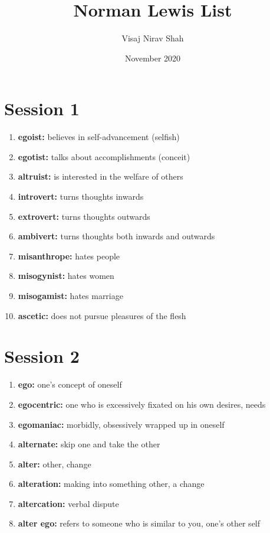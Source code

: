 \documentclass{article}
\title{\textbf{Norman Lewis List}}
\author{Visaj Nirav Shah}
\date{November 2020}
\begin{document}
\maketitle

\section{Session 1}
\begin{enumerate}
    \item \textbf{egoist: }{believes in self-advancement (selfish)} 
    \item \textbf{egotist: }{talks about accomplishments (conceit)}
    \item \textbf{altruist: }{is interested in the welfare of others}
    \item \textbf{introvert: }{turns thoughts inwards}
    \item \textbf{extrovert: }{turns thoughts outwards}
    \item \textbf{ambivert: }{turns thoughts both inwards and outwards}
    \item \textbf{misanthrope: }{hates people}
    \item \textbf{misogynist: }{hates women}
    \item \textbf{misogamist: }{hates marriage}
    \item \textbf{ascetic: }{does not pursue pleasures of the flesh}
    
\end{enumerate}

\section{Session 2}
\begin{enumerate}
    \item \textbf{ego: }{one's concept of oneself}
    \item \textbf{egocentric: }{one who is excessively fixated on his own desires, needs}
    \item \textbf{egomaniac: }{morbidly, obsessively wrapped up in oneself}
    \item \textbf{alternate: }{skip one and take the other}
    \item \textbf{alter: }{other, change}
    \item \textbf{alteration: }{making into something other, a change}
    \item \textbf{altercation: }{verbal dispute}
    \item \textbf{alter ego: }{refers to someone who is similar to you, one's other self}
    
\end{enumerate}
\end{document}
